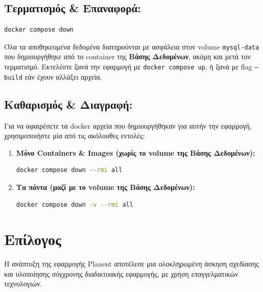 \documentclass[12pt]{fphw}
\newcommand{\en}[1]{\foreignlanguage{english}{#1}}
\begin{document}
\subsection{Τερματισμός \& Επαναφορά:}
\begin{lstlisting}[language=bash]
docker compose down
\end{lstlisting}
Όλα τα αποθηκευμένα δεδομένα διατηρούνται με ασφάλεια στον volume \texttt{mysql-data} που δημιουργήθηκε από το container της \textbf{Βάσης Δεδομένων}, ακόμη και μετά τον τερματισμό.
Εκτελέστε ξανά την εφαρμογή με \texttt{docker compose up}, ή ξανά με flag \texttt{--build} εάν έχουν αλλάξει αρχεία.


\subsection{Καθαρισμός \& Διαγραφή:}
Για να αφαιρέσετε τα docker αρχεία που δημιουργήθηκαν για αυτήν την εφαρμογή, χρησιμοποιήστε μία από τις ακόλουθες εντολές:

\begin{enumerate}[leftmargin=*]
    \item \textbf{Μόνο Containers \& Images (χωρίς το volume της Βάσης Δεδομένων):}
    \begin{lstlisting}[language=bash]
    docker compose down --rmi all
    \end{lstlisting}

    \item \textbf{Τα πάντα (μαζί με το volume της Βάσης Δεδομένων):}
    \begin{lstlisting}[language=bash]
    docker compose down -v --rmi all
    \end{lstlisting}
\end{enumerate}

\newpage

\section{Επίλογος}
Η ανάπτυξη της εφαρμογής \en{Planent} αποτέλεσε μια ολοκληρωμένη άσκηση σχεδίασης και υλοποίησης σύγχρονης διαδικτυακής εφαρμογής, με χρήση επαγγελματικών τεχνολογιών.
\end{document}

